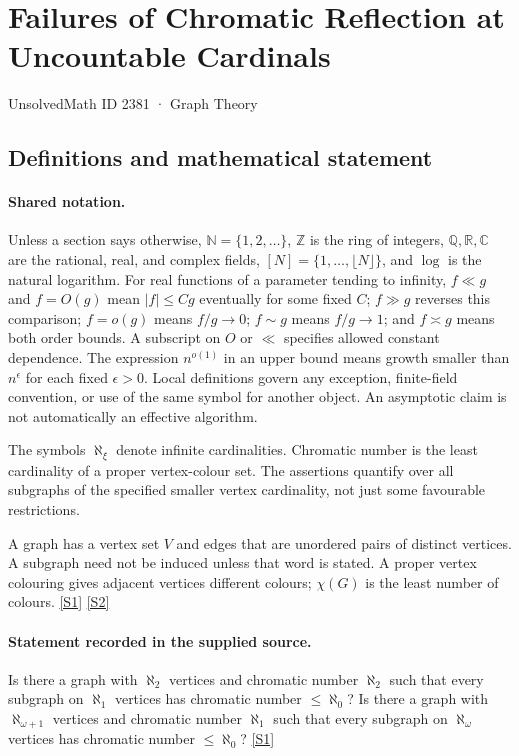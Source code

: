 \documentclass[11pt,a4paper]{article}
\newcommand{\N}{\mathbb{N}}
\newcommand{\Z}{\mathbb{Z}}
\newcommand{\Q}{\mathbb{Q}}
\newcommand{\R}{\mathbb{R}}
\newcommand{\C}{\mathbb{C}}
\newcommand{\sref}[2]{\hyperlink{source:#1:#2}{[S#2]}}
\begin{document}

\setcounter{section}{2380}

\section{Failures of Chromatic Reflection at Uncountable Cardinals}\label{2381}

{\small\sffamily UnsolvedMath ID 2381 · Graph Theory}

\subsection{Definitions and mathematical statement}

\paragraph{Shared notation.}Unless a section says otherwise, $\N=\{1,2,\ldots\}$,
$\Z$ is the ring of integers, $\Q,\R,\C$ are the rational, real, and complex
fields, $[N]=\{1,\ldots,\lfloor N\rfloor\}$, and $\log$ is the natural
logarithm. For real functions of a parameter tending to infinity,
$f\ll g$ and $f=O(g)$ mean $|f|\leq Cg$ eventually for some fixed $C$;
$f\gg g$ reverses this comparison; $f=o(g)$ means $f/g\to0$;
$f\sim g$ means $f/g\to1$; and $f\asymp g$ means both order bounds.
A subscript on $O$ or $\ll$ specifies allowed constant dependence.
The expression $n^{o(1)}$ in an upper bound means growth smaller than
$n^\epsilon$ for each fixed $\epsilon>0$. Local definitions govern any
exception, finite-field convention, or use of the same symbol for another
object. An asymptotic claim is not automatically an effective algorithm.



The symbols $\aleph_\xi$ denote infinite cardinalities. Chromatic number is the least cardinality of a proper vertex-colour set. The assertions quantify over all subgraphs of the specified smaller vertex cardinality, not just some favourable restrictions.

A graph has a vertex set $V$ and edges that are unordered pairs of distinct vertices. A subgraph need not be induced unless that word is stated. A proper vertex colouring gives adjacent vertices different colours; $\chi(G)$ is the least number of colours. \sref{2381}{1} \sref{2381}{2}

\paragraph{Statement recorded in the supplied source.}
Is there a graph with $\aleph_2$ vertices and chromatic number $\aleph_2$ such that every subgraph on $\aleph_1$ vertices has chromatic number $\leq\aleph_0$?
Is there a graph with $\aleph_{\omega+1}$ vertices and chromatic number $\aleph_1$ such that every subgraph on $\aleph_\omega$ vertices has chromatic number $\leq\aleph_0$? \sref{2381}{1}
\end{document}
